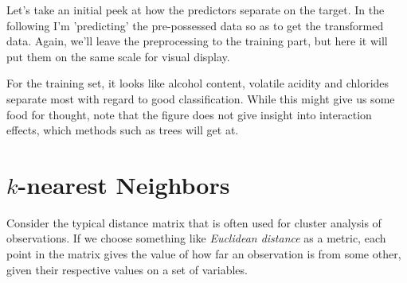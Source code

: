 \documentclass[english,nohyper,titlepage]{tufte-handout}\usepackage{knitr}
\begin{document}
Let's take an initial peek at how the predictors separate on the target.  In the following I'm 'predicting' the pre-possessed data so as to get the transformed data.  Again, we'll leave the preprocessing to the training part, but here it will put them on the same scale for visual display. 

\begin{knitrout}\footnotesize
{}\color{fgcolor}\begin{kframe}
\begin{alltt}
 \hlkwb{=} \hlstd{(}\hlstd{(wine_train[,}\hlopt{-}\hlstd{],} \hlstd{=}\hlstd{),}
                         \hlstd{wine_train[,}\hlopt{-}\hlstd{])}
\hlopt{$} \hlstd{)}
\end{alltt}
\end{kframe}
\end{knitrout}


For the training set, it looks like alcohol content, volatile acidity and chlorides separate most with regard to good classification. While this might give us some food for thought, note that the figure does not give insight into interaction effects, which methods such as trees will get at.

\section{$k$-nearest Neighbors}
Consider the typical distance matrix that is often used for cluster analysis of observations. If we choose something like \emph{Euclidean distance} as a metric, each point in the matrix gives the value of how far an observation is from some other, given their respective values on a set of variables.
\end{document}
